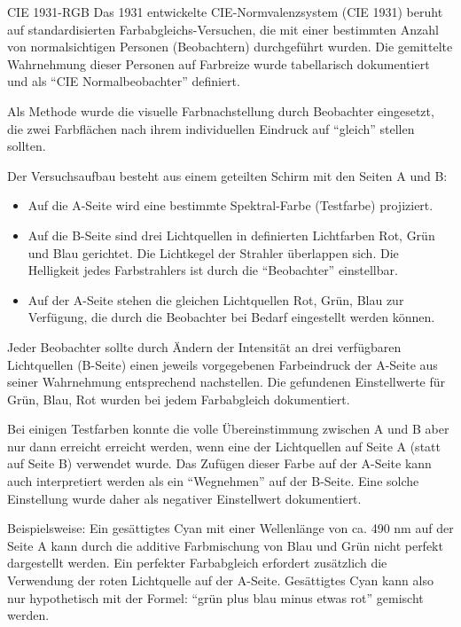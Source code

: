 \begin{bonus}[Farbmodell]{CIE 1931-RGB}
    Das 1931 entwickelte CIE-Normvalenzsystem (CIE 1931) beruht auf standardisierten Farbabgleichs-Versuchen, die mit einer bestimmten Anzahl von normalsichtigen Personen (Beobachtern) durchgeführt wurden.
    Die gemittelte Wahrnehmung dieser Personen auf Farbreize wurde tabellarisch dokumentiert und als \enquote{CIE Normalbeobachter} definiert.

    Als Methode wurde die visuelle Farbnachstellung durch Beobachter eingesetzt, die zwei Farbflächen nach ihrem individuellen Eindruck auf \enquote{gleich} stellen sollten.

    Der Versuchsaufbau besteht aus einem geteilten Schirm mit den Seiten A und B:
    \begin{itemize}
        \item Auf die A-Seite wird eine bestimmte Spektral-Farbe (Testfarbe) projiziert.
        \item Auf die B-Seite sind drei Lichtquellen in definierten Lichtfarben Rot, Grün und Blau gerichtet.
              Die Lichtkegel der Strahler überlappen sich.
              Die Helligkeit jedes Farbstrahlers ist durch die \enquote{Beobachter} einstellbar.
        \item Auf der A-Seite stehen die gleichen Lichtquellen Rot, Grün, Blau zur Verfügung, die durch die Beobachter bei Bedarf eingestellt werden können.
    \end{itemize}

    Jeder Beobachter sollte durch Ändern der Intensität an drei verfügbaren Lichtquellen (B-Seite) einen jeweils vorgegebenen Farbeindruck der A-Seite aus seiner Wahrnehmung entsprechend nachstellen.
    Die gefundenen Einstellwerte für Grün, Blau, Rot wurden bei jedem Farbabgleich dokumentiert.

    Bei einigen Testfarben konnte die volle Übereinstimmung zwischen A und B aber nur dann erreicht erreicht werden, wenn eine der Lichtquellen auf Seite A (statt auf Seite B) verwendet wurde.
    Das Zufügen dieser Farbe auf der A-Seite kann auch interpretiert werden als ein \enquote{Wegnehmen} auf der B-Seite.
    Eine solche Einstellung wurde daher als negativer Einstellwert dokumentiert.

    Beispielsweise:
    Ein gesättigtes Cyan mit einer Wellenlänge von ca. 490 nm auf der Seite A kann durch die additive Farbmischung von Blau und Grün nicht perfekt dargestellt werden.
    Ein perfekter Farbabgleich erfordert zusätzlich die Verwendung der roten Lichtquelle auf der A-Seite.
    Gesättigtes Cyan kann also nur hypothetisch mit der Formel:
    \enquote{grün plus blau minus etwas rot} gemischt werden.


\end{bonus}
